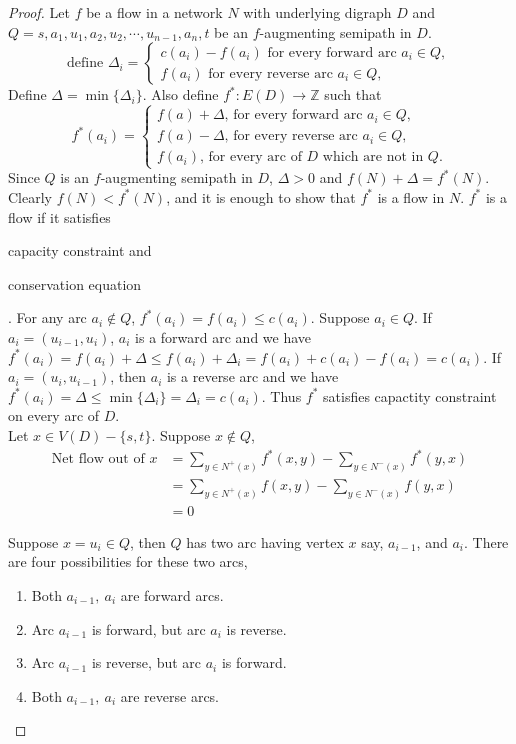 \begin{proof}
	Let $f$ be a flow in a network $N$ with underlying digraph $D$ and $Q = s, a_1, u_1, a_2, u_2, \cdots, u_{n-1}, a_n, t$ be an $f$-augmenting semipath in $D$.
	$$\text{define } \Delta_i = \begin{cases}
		c(a_i) - f(a_i) \text{ for every forward arc } a_i \in Q, \\
		f(a_i) \text{ for every reverse arc } a_i \in Q,
	\end{cases}$$
	Define $\Delta = \min \{ \Delta_i \}$. Also define $f^* : E(D) \to \mathbb{Z}$ such that 
	$$f^*(a_i) = \begin{cases} f(a) + \Delta \text{, for every forward arc } a_i \in Q, \\
	f(a) - \Delta \text{, for every reverse arc } a_i \in Q, \\
	f(a_i) \text{, for every arc of } D \text{ which are not in }Q.
	\end{cases}$$
		Since $Q$ is an $f$-augmenting semipath in $D$, $\Delta > 0$ and $f(N) + \Delta = f^*(N)$.\\

	Clearly $f(N) < f^*(N)$, and it is enough to show that $f^*$ is a flow in $N$. $f^*$ is a flow if it satisfies \begin{enumerate*} \item capacity constraint and \item conservation equation \end{enumerate*}. For any arc $a_i \not\in Q$, $f^*(a_i) = f(a_i) \le c(a_i)$. Suppose $a_i \in Q$. If $a_i = (u_{i-1},u_i)$, $a_i$ is a forward arc and we have $f^*(a_i) = f(a_i) + \Delta \le f(a_i) + \Delta_i = f(a_i) + c(a_i) - f(a_i) = c(a_i)$. If $a_i = (u_i,u_{i-1})$, then $a_i$ is a reverse arc and we have $f^*(a_i) = \Delta \le \min \{ \Delta_i \} = \Delta_i = c(a_i)$. Thus $f^*$ satisfies capactity constraint on every arc of $D$.\\

	Let $x \in V(D)-\{s,t\}$. Suppose $x \not\in Q$,
	\begin{align*}
		\text{Net flow out of } x
		& = \sum_{y \in N^+(x)} f^*(x,y) - \sum_{y \in N^-(x)} f^*(y,x) \\
		& = \sum_{y \in N^+(x)} f(x,y) - \sum_{y \in N^-(x)} f(y,x) \\
		& = 0
	\end{align*}
	
	Suppose $x = u_i \in Q$, then $Q$ has two arc having vertex $x$ say, $a_{i-1}$, and $a_i$. There are four possibilities for these two arcs,
	\begin{enumerate}
		\item Both $a_{i-1},\ a_i$ are forward arcs.
		\item Arc $a_{i-1}$ is forward, but arc $a_i$ is reverse.
		\item Arc $a_{i-1}$ is reverse, but arc $a_i$ is forward.
		\item Both $a_{i-1},\ a_i$ are reverse arcs.
	\end{enumerate}
	

\end{proof}
